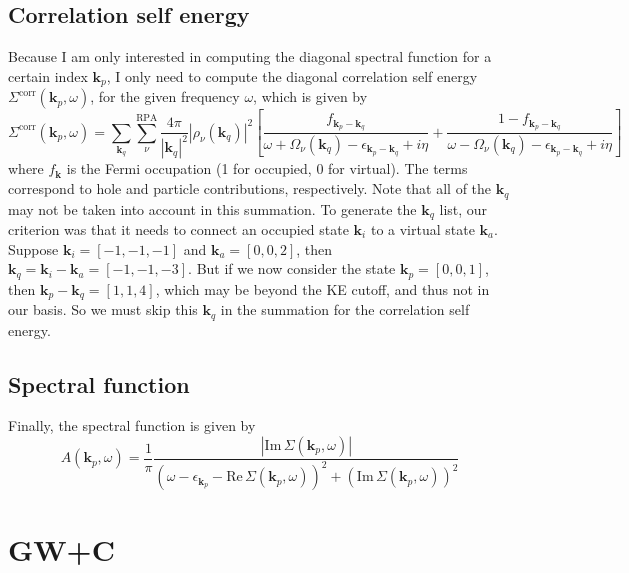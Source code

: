 \subsection{Correlation self energy}
Because I am only interested in computing the diagonal spectral function for a certain index $\bm{k}_p$, I only need to compute the diagonal correlation self energy $\Sigma^{\text{corr}}(\bm{k}_p,\omega)$, for the given frequency $\omega$, which is given by
\begin{equation}
    \Sigma^{\text{corr}}(\bm{k}_p,\omega) = \sum_{\bm{k}_q}\sum_{\nu }^{\text{RPA}} \frac{4\pi}{|\bm{k}_q|^2} |\rho_\nu(\bm{k}_q)|^2 \left[ \frac{f_{\bm{k}_p - \bm{k}_q}}{\omega + \Omega_\nu(\bm{k}_q) - \epsilon_{\bm{k}_p - \bm{k}_q} + i\eta} + \frac{1 - f_{\bm{k}_p - \bm{k}_q}}{\omega - \Omega_\nu(\bm{k}_q) - \epsilon_{\bm{k}_p - \bm{k}_q} + i\eta} \right]
\end{equation}
where $f_{\bm{k}}$ is the Fermi occupation (1 for occupied, 0 for virtual). The terms correspond to hole and particle contributions, respectively. Note that all of the $\bm{k}_q$ may not be taken into account in this summation. To generate the $\bm{k}_q$ list, our criterion was that it needs to connect an occupied state $\bm{k}_i$ to a virtual state $\bm{k}_a$. Suppose $\bm{k}_i = [-1,-1,-1]$ and $\bm{k}_a = [0,0,2]$, then $\bm{k}_q = \bm{k}_i - \bm{k}_a = [-1,-1,-3]$. But if we now consider the state $\bm{k}_p = [0,0,1]$, then $\bm{k}_p -\bm{k}_q = [1,1,4]$, which may be beyond the KE cutoff, and thus not in our basis. So we must skip this $\bm{k}_q$ in the summation for the correlation self energy.
\subsection{Spectral function}
Finally, the spectral function is given by
\begin{equation}
    A(\bm{k}_p,\omega) = \frac{1}{\pi} \frac{|\text{Im}\,\Sigma(\bm{k}_p,\omega)|}{\left(\omega - \epsilon_{\bm{k}_p} - \text{Re}\,\Sigma(\bm{k}_p,\omega)\right)^2 + \left(\text{Im}\,\Sigma(\bm{k}_p,\omega)\right)^2}
\end{equation}
\section{GW+C}
